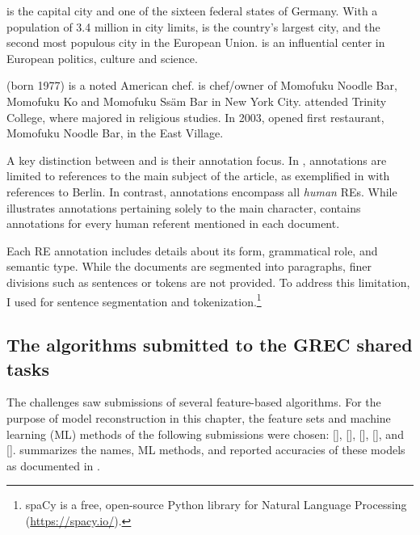\begin{exe}
	\ex \begin{xlist}
		\ex\label{ex:berlincity}  is the capital city and one of the sixteen federal states of Germany. With a population of 3.4 million in  city limits,  is the country's largest city, and the second most populous city in the European Union.  is an influential center in European politics, culture and science. 
		
		\ex\label{ex:davidchang}  (born 1977) is a noted American chef.  is chef/owner of Momofuku Noodle Bar, Momofuku Ko and Momofuku Ssäm Bar in New York City.  attended Trinity College, where  majored in religious studies. In 2003,  opened  first restaurant, Momofuku Noodle Bar, in the East Village.
	\end{xlist}
	
\end{exe}


A key distinction between \msrcor and \negcor is their annotation focus. In \msrcor, annotations are limited to references to the main subject of the article, as exemplified in  with references to Berlin. In contrast, \negcor annotations encompass all \textit{human} REs. While  illustrates annotations pertaining solely to the main character, \negcor contains annotations for every human referent mentioned in each document.

Each RE annotation includes details about its form, grammatical role, and semantic type. While the documents are segmented into paragraphs, finer divisions such as sentences or tokens are not provided. To address this limitation, I used  for sentence segmentation and tokenization.\footnote{spaCy is a free, open-source Python library for Natural Language Processing (\url{https://spacy.io/}).}

\subsection{The algorithms submitted to the GREC shared tasks}\label{subsec:systems}

The \grec challenges saw submissions of several feature-based algorithms. For the purpose of model reconstruction in this chapter, the feature sets and machine learning (ML) methods of the following submissions were chosen: \citet{hendrickx2008cnts} [], \citet{favre2009icsi}[], \citet{bohnet2008g} [], \citet{jamison2008osu} [], and \citet{greenbacker2009udel} [].  summarizes the names, ML methods, and reported accuracies of these models as documented in \citet{belz2010generating}.

